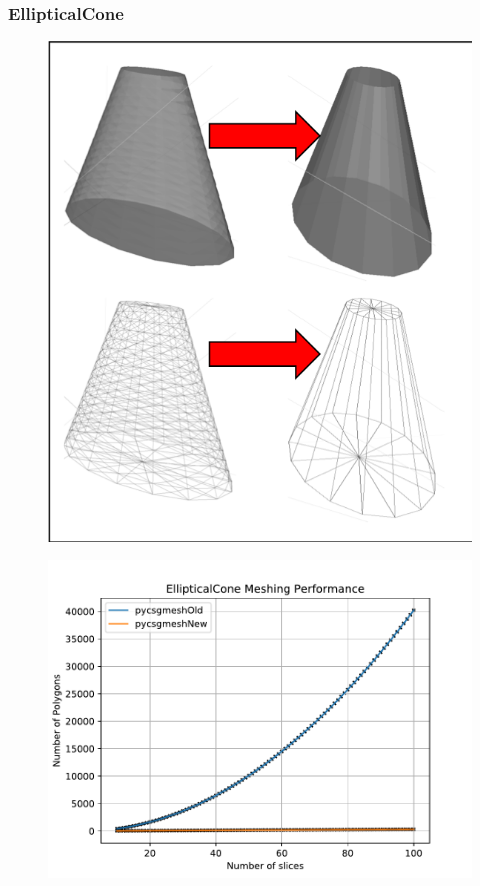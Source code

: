 \documentclass[12pt,a4paper]{article}
\begin{document}
\newpage
\subsubsection{EllipticalCone}

\begin{figure}[h!]
\centering
\begin{minipage}{.2\textwidth}
  \centering
  \includegraphics[height=1\linewidth]{Images//Meshes//ellipticalcone.png}
  \label{fig:test1}
\end{minipage}%
\begin{minipage}{.3\textwidth}
  \centering
  \includegraphics[scale=0.35]{Images//Quad_fits//Ellipticalcone_quad.pdf}
  \label{fig:test2}
\end{minipage}%
\end{figure}
\end{document}

